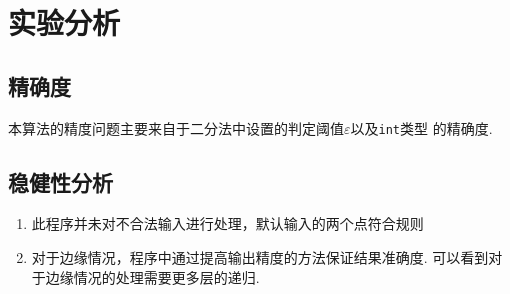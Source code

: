 \documentclass[UTF8]{ctexart}
\begin{document}
\section{实验分析}
\subsection{精确度}
本算法的精度问题主要来自于二分法中设置的判定阈值$\varepsilon$以及\lstinline{int}类型
的精确度. 
\subsection{稳健性分析}
\begin{enumerate}
  \item 此程序并未对不合法输入进行处理，默认输入的两个点符合规则
  \item 对于边缘情况，程序中通过提高输出精度的方法保证结果准确度. 可以看到对于边缘情况的处理需要更多层的递归.
\end{enumerate}


\end{document}
